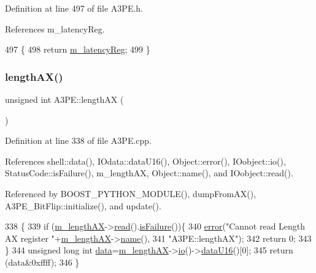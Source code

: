 Definition at line 497 of file A3\+P\+E.\+h.



References m\+\_\+latency\+Reg.


\begin{DoxyCode}
497                         \{
498     \textcolor{keywordflow}{return} \hyperlink{classA3PE_a96a167e73e264da5a18d9ddb5ebb5f23}{m\_latencyReg};
499   \}
\end{DoxyCode}
\mbox{\label{classA3PE_acb95104d817db2e4f97e250f7e45b43d}} 
\subsubsection{\texorpdfstring{length\+A\+X()}{lengthAX()}}
{\footnotesize\ttfamily unsigned int A3\+P\+E\+::length\+AX (\begin{DoxyParamCaption}{ }\end{DoxyParamCaption})}



Definition at line 338 of file A3\+P\+E.\+cpp.



References shell\+::data(), I\+Odata\+::data\+U16(), Object\+::error(), I\+Oobject\+::io(), Status\+Code\+::is\+Failure(), m\+\_\+length\+AX, Object\+::name(), and I\+Oobject\+::read().



Referenced by B\+O\+O\+S\+T\+\_\+\+P\+Y\+T\+H\+O\+N\+\_\+\+M\+O\+D\+U\+L\+E(), dump\+From\+A\+X(), A3\+P\+E\+\_\+\+Bit\+Flip\+::initialize(), and update().


\begin{DoxyCode}
338                            \{
339   \textcolor{keywordflow}{if} (\hyperlink{classA3PE_a87c93a38343873f2d52741deca4750ce}{m\_lengthAX}->\hyperlink{classIOobject_aa07610c11963b1db6710e3c76ceea456}{read}().\hyperlink{classStatusCode_a5dd22dc6eb2c52fc4cabc58f6dea2eb7}{isFailure}())\{
340     \hyperlink{classObject_a204a95f57818c0f811933917a30eff45}{error}(\textcolor{stringliteral}{"Cannot read Length AX register "}+\hyperlink{classA3PE_a87c93a38343873f2d52741deca4750ce}{m\_lengthAX}->\hyperlink{classObject_a300f4c05dd468c7bb8b3c968868443c1}{name}(),
341         \textcolor{stringliteral}{"A3PE::lengthAX"});
342     \textcolor{keywordflow}{return} 0;
343   \}
344   \textcolor{keywordtype}{unsigned} \textcolor{keywordtype}{long} \textcolor{keywordtype}{int} \hyperlink{namespaceshell_a5ea2525995cedc3efd69ea8a7f034d1e}{data}=\hyperlink{classA3PE_a87c93a38343873f2d52741deca4750ce}{m\_lengthAX}->\hyperlink{classIOobject_af04fb94137c3d86849f478ac5afab5d1}{io}()->\hyperlink{classIOdata_a8d8528b731c6cf117f8c5b9b2473390c}{dataU16}()[0];
345   \textcolor{keywordflow}{return} (data&0xffff);
346 \}
\end{DoxyCode}
\mbox{\label{classA3PE_a65235f7d42e8f7fb6056f5629545d2aa}} 
